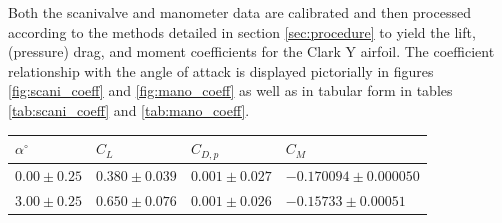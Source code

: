 \documentclass[runningheads]{llncs}
\begin{document}
\noindent
Both the scanivalve and manometer data are calibrated and then processed according to the methods detailed in section \ref{sec:procedure} to yield the lift, (pressure) drag, and  moment coefficients for the Clark Y airfoil. The coefficient relationship with the angle of attack is displayed pictorially in figures \ref{fig:scani_coeff} and \ref{fig:mano_coeff} as well as in tabular form in tables \ref{tab:scani_coeff} and \ref{tab:mano_coeff}.\newline

\begin{table}[h]
\centering
\begin{tabular}{p{3cm}p{3cm}p{3cm}p{3cm}}
\toprule
$\alpha^\circ$ &                   $C_L$ &               $C_{D,p}$ &                    $C_M$ \\
\midrule
 $0.00\pm0.25$ & $0.380\pm0.039$ & $0.001\pm0.027$ &  $-0.170094\pm0.000050$ \\
 $3.00\pm0.25$ & $0.650\pm0.076$ & $0.001\pm0.026$ & $-0.15733\pm0.00051$ \\

\end{tabular}
\end{table}
\end{document}

